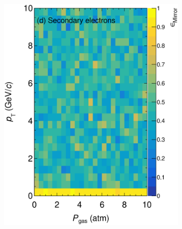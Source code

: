 \begin{figure}[!ht]
\begin{subfigure}[b]{0.32\textwidth}
         \includegraphics[width=\textwidth]{figures/ch5-KF_NDGAr/ToySample/ParScan/testTPCMirrorMirrorRatioVSpTVSdens_sec_e.eps}
         \caption{}
         \label{fig:MirrorRatiop_Sec_e}
     \end{subfigure}
     \begin{subfigure}[b]{0.32\textwidth}
         \centering

\end{subfigure}
\end{figure}
